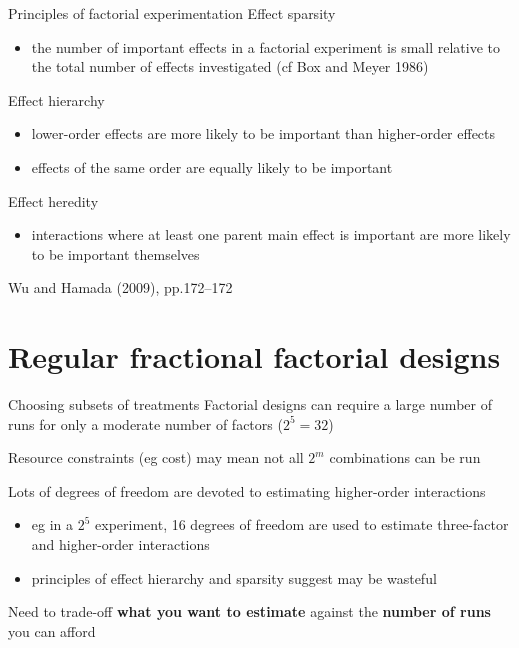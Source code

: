 \documentclass[
  ignorenonframetext,
]{beamer}
\providecommand{\tightlist}{%
  \setlength{\itemsep}{0pt}\setlength{\parskip}{0pt}}
\begin{document}
\begin{frame}{Principles of factorial experimentation}
\protect\hypertarget{principles-of-factorial-experimentation}{}
Effect sparsity

\begin{itemize}
\tightlist
\item
  the number of important effects in a factorial experiment is small
  relative to the total number of effects investigated (cf Box and Meyer
  1986)
\end{itemize}

Effect hierarchy

\begin{itemize}
\tightlist
\item
  lower-order effects are more likely to be important than higher-order
  effects
\item
  effects of the same order are equally likely to be important
\end{itemize}

Effect heredity

\begin{itemize}
\tightlist
\item
  interactions where at least one parent main effect is important are
  more likely to be important themselves
\end{itemize}

Wu and Hamada (2009), pp.172--172
\end{frame}

\hypertarget{regular-fractional-factorial-designs}{%
\section{Regular fractional factorial
designs}\label{regular-fractional-factorial-designs}}

\begin{frame}{Choosing subsets of treatments}
\protect\hypertarget{choosing-subsets-of-treatments}{}
Factorial designs can require a large number of runs for only a moderate
number of factors (\(2^5 = 32\))

Resource constraints (eg cost) may mean not all \(2^m\) combinations can
be run

Lots of degrees of freedom are devoted to estimating higher-order
interactions

\begin{itemize}
\tightlist
\item
  eg in a \(2^5\) experiment, 16 degrees of freedom are used to estimate
  three-factor and higher-order interactions
\item
  principles of effect hierarchy and sparsity suggest may be wasteful
\end{itemize}

Need to trade-off \textbf{what you want to estimate} against the
\textbf{number of runs} you can afford
\end{frame}
\end{document}
